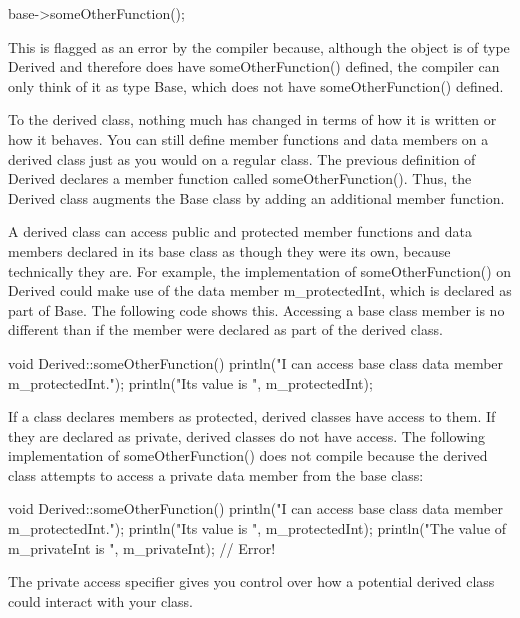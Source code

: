 \begin{cpp}
base->someOtherFunction();
\end{cpp}

This is flagged as an error by the compiler because, although the object is of type Derived and therefore does have someOtherFunction() defined, the compiler can only think of it as type Base, which does not have someOtherFunction() defined.


To the derived class, nothing much has changed in terms of how it is written or how it behaves. You can still define member functions and data members on a derived class just as you would on a regular class. The previous definition of Derived declares a member function called someOtherFunction(). Thus, the Derived class augments the Base class by adding an additional member function.

A derived class can access public and protected member functions and data members declared in its base class as though they were its own, because technically they are. For example, the implementation of someOtherFunction() on Derived could make use of the data member m\_protectedInt, which is declared as part of Base. The following code shows this. Accessing a base class member is no different than if the member were declared as part of the derived class.

\begin{cpp}
void Derived::someOtherFunction()
{
    println("I can access base class data member m_protectedInt.");
    println("Its value is {}", m_protectedInt);
}
\end{cpp}

If a class declares members as protected, derived classes have access to them. If they are declared as private, derived classes do not have access. The following implementation of someOtherFunction() does not compile because the derived class attempts to access a private data member from the base class:

\begin{cpp}
void Derived::someOtherFunction()
{
    println("I can access base class data member m_protectedInt.");
    println("Its value is {}", m_protectedInt);
    println("The value of m_privateInt is {}", m_privateInt); // Error!
}
\end{cpp}

The private access specifier gives you control over how a potential derived class could interact with your class.

